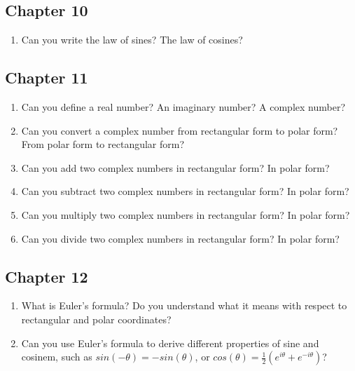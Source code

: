 \subsection{Chapter 10}
\begin{enumerate}

\item{Can you write the law of sines?  The law of cosines?}

\end{enumerate}
\subsection{Chapter 11}
\begin{enumerate}

\item{Can you define a real number?  An imaginary number?  A complex number?}

\item{Can you convert a complex number from rectangular form to polar form?  From polar form to rectangular form?}

\item{Can you add two complex numbers in rectangular form?  In polar form?}

\item{Can you subtract two complex numbers in rectangular form?  In polar form?}

\item{Can you multiply two complex numbers in rectangular form?  In polar form?}

\item{Can you divide two complex numbers in rectangular form?  In polar form?}

\end{enumerate}
\subsection{Chapter 12}
\begin{enumerate}

\item{What is Euler's formula?  Do you understand what it means with respect to rectangular and polar coordinates?}

\item{Can you use Euler's formula to derive different properties of sine and cosinem, such as $sin(-\theta) = -sin(\theta)$, or $cos(\theta) = \frac{1}{2}(e^{i\theta} + e^{-i\theta})$?}

\end{enumerate}
